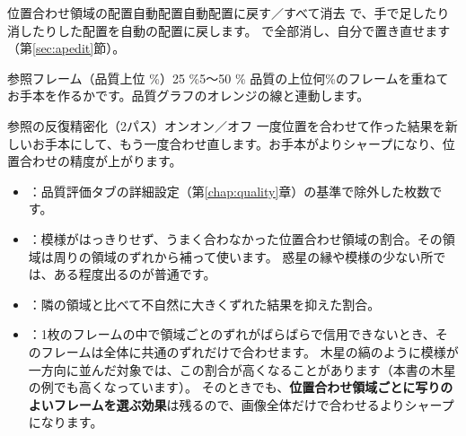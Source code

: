 \begin{setting}{ 位置合わせ領域の配置}{自動配置}{自動配置に戻す／すべて消去}
   で、手で足したり消したりした配置を自動の配置に戻します。 で全部消し、自分で置き直せます（第\ref{sec:apedit}節）。
\end{setting}

\begin{setting}{ 参照フレーム（品質上位 \%）}{25 \%}{5〜50 \%}
  品質の上位何\%のフレームを重ねてお手本を作るかです。品質グラフのオレンジの線と連動します。
\end{setting}

\begin{setting}{ 参照の反復精密化（2パス）}{オン}{オン／オフ}
  一度位置を合わせて作った結果を新しいお手本にして、もう一度合わせ直します。お手本がよりシャープになり、位置合わせの精度が上がります。
\end{setting}

\begin{tip}[結果の内訳の読み方]
  \begin{itemize}[itemsep=0pt, topsep=2pt]
    \item {}：品質評価タブの詳細設定（第\ref{chap:quality}章）の基準で除外した枚数です。
    \item {}：模様がはっきりせず、うまく合わなかった位置合わせ領域の割合。その領域は周りの領域のずれから補って使います。
          惑星の縁や模様の少ない所では、ある程度出るのが普通です。
    \item {}：隣の領域と比べて不自然に大きくずれた結果を抑えた割合。
    \item {}：1枚のフレームの中で領域ごとのずれがばらばらで信用できないとき、そのフレームは全体に共通のずれだけで合わせます。
          木星の縞のように模様が一方向に並んだ対象では、この割合が高くなることがあります（本書の木星の例でも高くなっています）。
          そのときでも、\textbf{位置合わせ領域ごとに写りのよいフレームを選ぶ効果}は残るので、画像全体だけで合わせるよりシャープになります。
  \end{itemize}
\end{tip}

